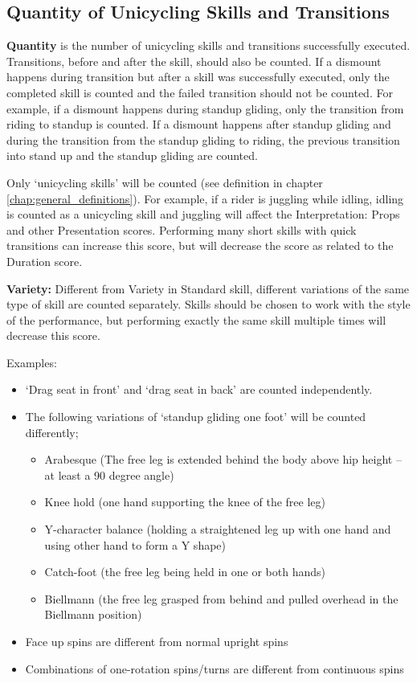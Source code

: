 \subsection{Quantity of Unicycling Skills and Transitions}
\textbf{Quantity} is the number of unicycling skills and transitions successfully executed.
Transitions, before and after the skill, should also be counted.
If a dismount happens during transition but after a skill was successfully executed, only the completed skill is counted and the failed transition should not be counted.
For example, if a dismount happens during standup gliding, only the transition from riding to standup is counted.
If a dismount happens after standup gliding and during the transition from the standup gliding to riding, the previous transition into stand up and the standup gliding are counted.

Only `unicycling skills' will be counted (see definition in chapter \ref{chap:general_definitions}).
For example, if a rider is juggling while idling, idling is counted as a unicycling skill and juggling will affect the Interpretation: Props and other Presentation scores.
Performing many short skills with quick transitions can increase this score, but will decrease the score as related to the Duration score.

\textbf{Variety:} Different from Variety in Standard skill, different variations of the same type of skill are counted separately.
Skills should be chosen to work with the style of the performance, but performing exactly the same skill multiple times will decrease this score.

Examples:
\begin{itemize}
\item `Drag seat in front' and `drag seat in back' are counted independently.
\item The following variations of `standup gliding one foot' will be counted differently;
	\begin{itemize}
 	\item Arabesque (The free leg is extended behind the body above hip height – at least a 90 degree angle)
	\item Knee hold (one hand supporting the knee of the free leg)
	\item Y-character balance (holding a straightened leg up with one hand and using other hand to form a Y shape)
	\item Catch-foot (the free leg being held in one or both hands)
	\item Biellmann (the free leg grasped from behind and pulled overhead in the Biellmann position) 
	\end{itemize}
\item Face up spins are different from normal upright spins 
\item Combinations of one-rotation spins/turns are different from continuous spins
\end{itemize}

